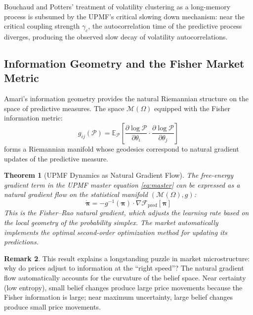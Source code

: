 \documentclass[12pt,a4paper]{article}
\newtheorem{theorem}{Theorem}[section]
\theoremstyle{definition}
\newtheorem{remark}[theorem]{Remark}
\newcommand{\E}{\mathbb{E}}
\newcommand{\M}{\mathcal{M}}
\newcommand{\PP}{\mathcal{P}}
\begin{document}
Bouchaud and Potters' \citeyearpar{bouchaud2003} treatment of volatility clustering as a long-memory process is subsumed by the UPMF's critical slowing down mechanism: near the critical coupling strength $\gamma_c$, the autocorrelation time of the predictive process diverges, producing the observed slow decay of volatility autocorrelations.

\subsection{Information Geometry and the Fisher Market Metric}\label{sec:lit_infogeom}

Amari's \citeyearpar{amari2016} information geometry provides the natural Riemannian structure on the space of predictive measures. The space $\M(\Omega)$ equipped with the Fisher information metric:
\begin{equation}\label{eq:fisher_metric}
    g_{ij}(\PP) = \E_\PP\left[\frac{\partial \log \PP}{\partial \theta_i} \cdot \frac{\partial \log \PP}{\partial \theta_j}\right]
\end{equation}
forms a Riemannian manifold whose geodesics correspond to natural gradient updates of the predictive measure.

\begin{theorem}[UPMF Dynamics as Natural Gradient Flow]\label{thm:nat_grad}
The free-energy gradient term in the UPMF master equation \eqref{eq:master} can be expressed as a natural gradient flow on the statistical manifold $(\M(\Omega), g)$:
\begin{equation}\label{eq:nat_grad}
    \dot{\boldsymbol{\pi}} = -g^{-1}(\boldsymbol{\pi}) \cdot \nabla \mathcal{F}_{\text{pred}}[\boldsymbol{\pi}]
\end{equation}
This is the Fisher--Rao natural gradient, which adjusts the learning rate based on the local geometry of the probability simplex. The market automatically implements the optimal second-order optimization method for updating its predictions.
\end{theorem}

\begin{remark}
This result explains a longstanding puzzle in market microstructure: why do prices adjust to information at the ``right speed''? The natural gradient flow automatically accounts for the curvature of the belief space. Near certainty (low entropy), small belief changes produce large price movements because the Fisher information is large; near maximum uncertainty, large belief changes produce small price movements.
\end{remark}
\end{document}
